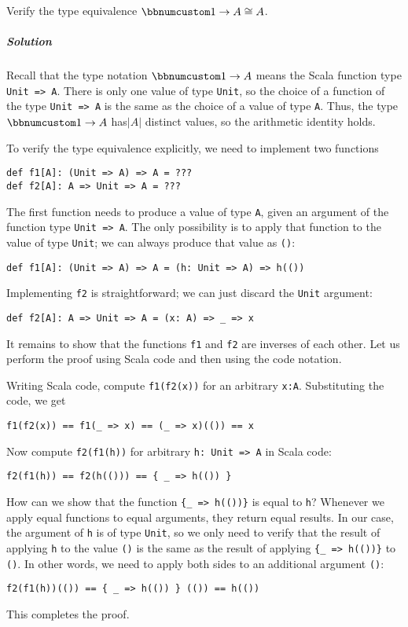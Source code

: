 Verify the type equivalence $\bbnum 1\rightarrow A\cong A$.

\subparagraph{Solution}

Recall that the type notation $\bbnum 1\rightarrow A$ means the Scala
function type \lstinline!Unit => A!. There is only one value of type
\lstinline!Unit!, so the choice of a function of the type \lstinline!Unit => A!
is the same as the choice of a value of type \lstinline!A!. Thus,
the type $\bbnum 1\rightarrow A$ has$\left|A\right|$ distinct values,
so the arithmetic identity holds.

To verify the type equivalence explicitly, we need to implement two
functions
\begin{lstlisting}
def f1[A]: (Unit => A) => A = ???
def f2[A]: A => Unit => A = ???
\end{lstlisting}
The first function needs to produce a value of type \lstinline!A!,
given an argument of the function type \lstinline!Unit => A!. The
only possibility is to apply that function to the value of type \lstinline!Unit!;
we can always produce that value as \lstinline!()!:
\begin{lstlisting}
def f1[A]: (Unit => A) => A = (h: Unit => A) => h(())
\end{lstlisting}
Implementing \lstinline!f2! is straightforward; we can just discard
the \lstinline!Unit! argument:
\begin{lstlisting}
def f2[A]: A => Unit => A = (x: A) => _ => x
\end{lstlisting}
It remains to show that the functions \lstinline!f1! and \lstinline!f2!
are inverses of each other. Let us perform the proof using Scala code
and then using the code notation.

Writing Scala code, compute \lstinline!f1(f2(x))! for an arbitrary
\lstinline!x:A!. Substituting the code, we get
\begin{lstlisting}
f1(f2(x)) == f1(_ => x) == (_ => x)(()) == x
\end{lstlisting}
Now compute \lstinline!f2(f1(h))! for arbitrary \lstinline!h: Unit => A!
in Scala code:
\begin{lstlisting}
f2(f1(h)) == f2(h(())) == { _ => h(()) }
\end{lstlisting}
How can we show that the function \lstinline!{_ => h(())}! is equal
to \lstinline!h!? Whenever we apply equal functions to equal arguments,
they return equal results. In our case, the argument of \lstinline!h!
is of type \lstinline!Unit!, so we only need to verify that the result
of applying \lstinline!h! to the value \lstinline!()! is the same
as the result of applying \lstinline!{_ => h(())}! to \lstinline!()!.
In other words, we need to apply both sides to an additional argument
\lstinline!()!:
\begin{lstlisting}
f2(f1(h))(()) == { _ => h(()) } (()) == h(())
\end{lstlisting}
This completes the proof.

